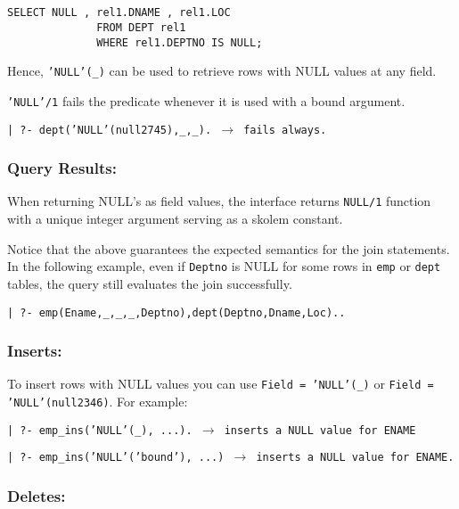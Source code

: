 \begin{verbatim}


SELECT NULL , rel1.DNAME , rel1.LOC
			  FROM DEPT rel1
			  WHERE rel1.DEPTNO IS NULL;
\end{verbatim}

Hence, {\tt 'NULL'(\_)} can be used to retrieve rows with NULL values 
at any field.

{\tt 'NULL'/1} fails the predicate whenever it is
used with a bound argument.
\begin{center}

{\tt | ?- dept('NULL'(null2745),\_,\_). $\rightarrow$ fails always.}
\end{center}


\subsubsection{Query Results:}
When returning NULL's as field values, the interface returns {\tt NULL/1} 
function with a unique integer argument serving as a skolem constant.

Notice that the above guarantees the expected semantics for the join 
statements.  In the following example, even if {\tt Deptno} is NULL for some rows in {\tt emp} or {\tt dept} tables, the query still evaluates the join successfully.
\begin{center}

{\tt | ?- emp(Ename,\_,\_,\_,Deptno),dept(Deptno,Dname,Loc)..}
\end{center}

\subsubsection{Inserts:}

To insert rows with NULL values you can use {\tt Field = 'NULL'(\_)} or
{\tt Field = 'NULL'(null2346)}.  For example:

\begin{center}

{\tt | ?- emp\_ins('NULL'(\_), ...).  $\rightarrow$ inserts a NULL value for ENAME}
\end{center}
\begin{center}

{\tt | ?- emp\_ins('NULL'('bound'), ...) $\rightarrow$ inserts a NULL value for ENAME.}

\end{center}


\subsubsection{Deletes:}


